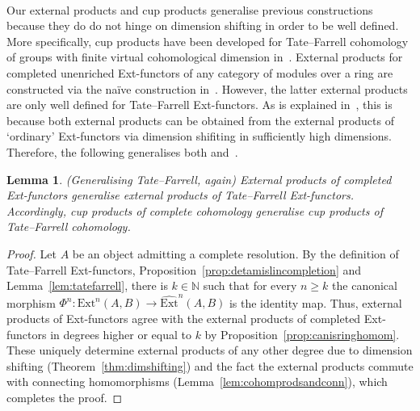 \documentclass[12pt, a4paper]{article}
\numberwithin{equation}{section}
\newtheorem{lem}[thm]{Lemma}
\theoremstyle{empty}
\theoremstyle{nonumberplain}
\newtheorem{proof}{Proof}
\begin{document}
\begin{samepage}
\begin{center}
{
}
\end{center}
{\vspace{-110mm}
\begin{equation}\label{diag:extproddoublecube}
{} \quad {}
\end{equation}
${} \quad {}$ \vspace{100mm}}
\end{samepage}

Our external products and cup products generalise previous constructions because they do do not hinge on dimension shifting in order to be well defined. More specifically, cup products have been developed for Tate--Farrell cohomology of groups with finite virtual cohomological dimension in~\cite[pp.~278--279]{bro82}. External products for completed unenriched Ext-functors of any category of modules over a ring are constructed via the naïve construction in~\cite[p.~110]{ben92}. However, the latter external products are only well defined for Tate--Farrell Ext-functors. As is explained in~\cite[pp.~278--279]{bro82}, this is because both external products can be obtained from the external products of `ordinary' Ext-functors via dimension shifiting in sufficiently high dimensions. Therefore, the following generalises both \cite[p.~110]{ben92} and~\cite[pp.~278--279]{bro82}.

\begin{lem}\label{lem:tatefarrelltwo}
(Generalising Tate--Farrell, again)\newline
External products of completed Ext-functors generalise external products of Tate--Farrell Ext-functors. Accordingly, cup products of complete cohomology generalise cup products of Tate--Farrell cohomology.
\end{lem}

\begin{proof}
Let $A$ be an object admitting a complete resolution. By the definition of Tate--Farrell Ext-functors, Proposition~\ref{prop:detamislincompletion} and Lemma~\ref{lem:tatefarrell}, there is $k \in \mathbb{N}$ such that for every $n \geq k$ the canonical morphism $\Phi^n: \mathrm{Ext}^n(A, B) \rightarrow \widehat{\mathrm{Ext}}^n(A, B)$ is the identity map. Thus, external products of Ext-functors agree with the external products of completed Ext-functors in degrees higher or equal to $k$ by Proposition~\ref{prop:canisringhomom}. These uniquely determine external products of any other degree due to dimension shifting (Theorem~\ref{thm:dimshifting}) and the fact the external products commute with connecting homomorphisms (Lemma~\ref{lem:cohomprodsandconn}), which completes the proof.
\end{proof}
\end{document}
